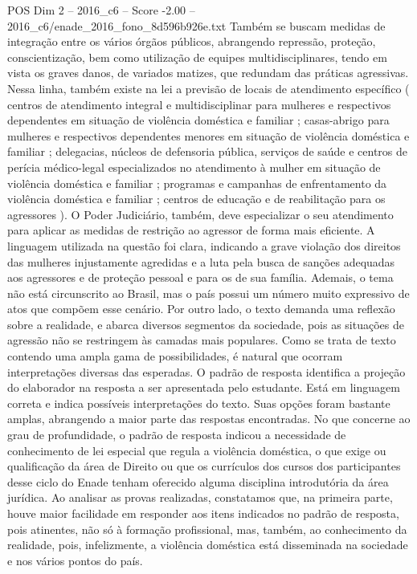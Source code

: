 \begin{textsample}{POS Dim 2 – 2016\_c6 – Score -2.00 – 2016\_c6/enade\_2016\_fono\_8d596b926e.txt}
Também se buscam medidas de integração entre os vários órgãos públicos, abrangendo repressão, proteção, conscientização, bem como utilização de equipes multidisciplinares, tendo em vista os graves danos, de variados matizes, que redundam das práticas agressivas.
Nessa linha, também existe na lei a previsão de locais de atendimento específico ( centros de atendimento integral e multidisciplinar para mulheres e respectivos dependentes em situação de violência doméstica e familiar ; casas-abrigo para mulheres e respectivos dependentes menores em situação de violência doméstica e familiar ; delegacias, núcleos de defensoria pública, serviços de saúde e centros de perícia médico-legal especializados no atendimento à mulher em situação de violência doméstica e familiar ; programas e campanhas de enfrentamento da violência doméstica e familiar ; centros de educação e de reabilitação para os agressores ).
O Poder Judiciário, também, deve especializar o seu atendimento para aplicar as medidas de restrição ao agressor de forma mais eficiente.
A linguagem utilizada na questão foi clara, indicando a grave violação dos direitos das mulheres injustamente agredidas e a luta pela busca de sanções adequadas aos agressores e de proteção pessoal e para os de sua família.
Ademais, o tema não está circunscrito ao Brasil, mas o país possui um número muito expressivo de atos que compõem esse cenário.
Por outro lado, o texto demanda uma reflexão sobre a realidade, e abarca diversos segmentos da sociedade, pois as situações de agressão não se restringem às camadas mais populares.
Como se trata de texto contendo uma ampla gama de possibilidades, é natural que ocorram interpretações diversas das esperadas.
O padrão de resposta identifica a projeção do elaborador na resposta a ser apresentada pelo estudante.
Está em linguagem correta e indica possíveis interpretações do texto.
Suas opções foram bastante amplas, abrangendo a maior parte das respostas encontradas.
No que concerne ao grau de profundidade, o padrão de resposta indicou a necessidade de conhecimento de lei especial que regula a violência doméstica, o que exige ou qualificação da área de Direito ou que os currículos dos cursos dos participantes desse ciclo do Enade tenham oferecido alguma disciplina introdutória da área jurídica.
Ao analisar as provas realizadas, constatamos que, na primeira parte, houve maior facilidade em responder aos itens indicados no padrão de resposta, pois atinentes, não só à formação profissional, mas, também, ao conhecimento da realidade, pois, infelizmente, a violência doméstica está disseminada na sociedade e nos vários pontos do país.

\end{textsample}
